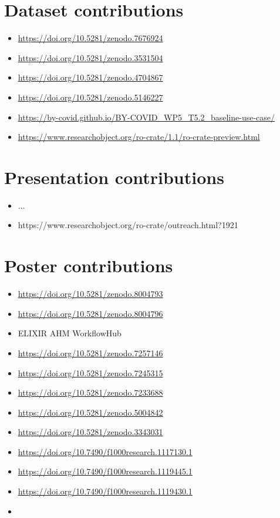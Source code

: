 \section{Dataset contributions}

\begin{itemize}
  \item \url{https://doi.org/10.5281/zenodo.7676924}
  \item \url{https://doi.org/10.5281/zenodo.3531504}
  \item \url{https://doi.org/10.5281/zenodo.4704867} 
  \item \url{https://doi.org/10.5281/zenodo.5146227}
  \item \url{https://by-covid.github.io/BY-COVID_WP5_T5.2_baseline-use-case/}
  \item \url{https://www.researchobject.org/ro-crate/1.1/ro-crate-preview.html}
\end{itemize}

\section{Presentation contributions}
\begin{itemize}

\item ...
  \item https://www.researchobject.org/ro-crate/outreach.html?1921
\end{itemize}

\section{Poster contributions}

\begin{itemize}
  \item \url{https://doi.org/10.5281/zenodo.8004793}
  \item \url{https://doi.org/10.5281/zenodo.8004796}
  \item ELIXIR AHM WorkflowHub
  \item \url{https://doi.org/10.5281/zenodo.7257146}
  \item \url{https://doi.org/10.5281/zenodo.7245315}
  \item \url{https://doi.org/10.5281/zenodo.7233688}
  \item \url{https://doi.org/10.5281/zenodo.5004842}
  \item \url{https://doi.org/10.5281/zenodo.3343031}
  \item \url{https://doi.org/10.7490/f1000research.1117130.1}
  \item \url{https://doi.org/10.7490/f1000research.1119445.1}
  \item \url{https://doi.org/10.7490/f1000research.1119430.1}
  \item 
\end{itemize}
